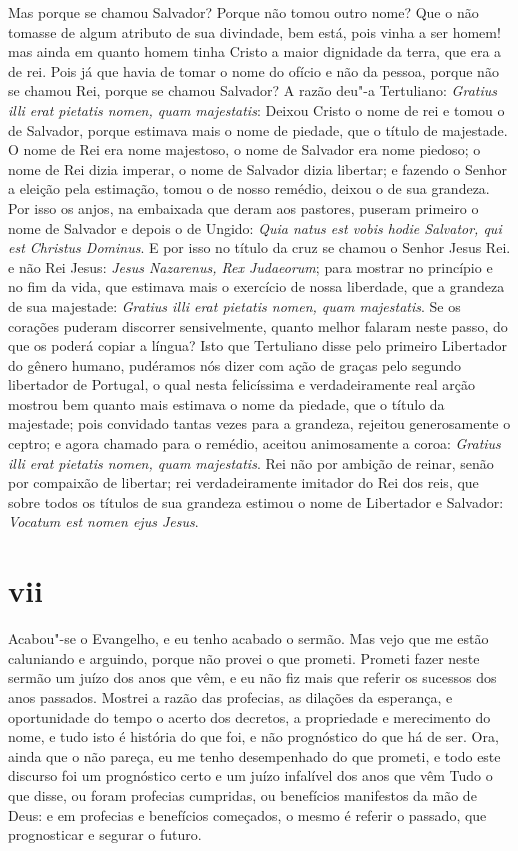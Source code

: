Mas porque se chamou Salvador? Porque não tomou outro nome? Que o não
tomasse de algum atributo de sua divindade, bem está, pois vinha a ser
homem! mas ainda em quanto homem tinha Cristo a maior dignidade da
terra, que era a de rei. Pois já que havia de tomar o nome do ofício e
não da pessoa, porque não se chamou Rei, porque se chamou Salvador? A
razão deu"-a Tertuliano: \emph{Gratius illi erat pietatis nomen, quam
majestatis}: Deixou Cristo o nome de rei e tomou o de Salvador, porque
estimava mais o nome de piedade, que o título de majestade. O nome de
Rei era nome majestoso, o nome de Salvador era nome piedoso; o nome de
Rei dizia imperar, o nome de Salvador dizia libertar; e fazendo o Senhor
a eleição pela estimação, tomou o de nosso remédio, deixou o de sua
grandeza. Por isso os anjos, na embaixada que deram aos pastores,
puseram primeiro o nome de Salvador e depois o de Ungido: \emph{Quia
natus est vobis hodie Salvator, qui est Christus Dominus}. E por isso no
título da cruz se chamou o Senhor Jesus Rei. e não Rei Jesus:
\emph{Jesus Nazarenus, Rex Judaeorum}; para mostrar no princípio e no
fim da vida, que estimava mais o exercício de nossa liberdade, que a
grandeza de sua majestade: \emph{Gratius illi erat pietatis nomen, quam
majestatis}.
Se os corações puderam discorrer sensivelmente, quanto melhor falaram
neste passo, do que os poderá copiar a língua? Isto que Tertuliano disse
pelo primeiro Libertador do gênero humano, pudéramos nós dizer com ação
de graças
pelo segundo libertador de Portugal, o qual nesta felicíssima e
verdadeiramente real arção mostrou bem quanto mais estimava o nome da
piedade, que o título da majestade; pois convidado tantas vezes para a
grandeza, rejeitou generosamente o ceptro; e agora chamado para o
remédio, aceitou animosamente a coroa: \emph{Gratius illi erat pietatis
nomen, quam majestatis}. Rei não por ambição de reinar, senão por
compaixão de libertar; rei verdadeiramente imitador do Rei dos reis, que
sobre todos os títulos de sua grandeza estimou o nome de Libertador e
Salvador: \emph{Vocatum est nomen ejus Jesus}.

\section*{vii}

Acabou"-se o Evangelho, e eu tenho acabado o sermão. Mas vejo que me
estão caluniando e arguindo, porque não provei o que prometi. Prometi
fazer neste sermão um juízo dos anos que vêm, e eu não fiz mais que
referir os sucessos dos anos passados. Mostrei a razão das profecias, as
dilações da esperança, e oportunidade do tempo o acerto dos decretos, a
propriedade e merecimento do nome, e tudo isto é história do que foi, e
não prognóstico do que há de ser. Ora, ainda que o não pareça, eu me
tenho desempenhado do que prometi, e todo este discurso foi um
prognóstico certo e um juízo infalível dos anos que vêm Tudo o que
disse, ou foram profecias cumpridas, ou benefícios manifestos da mão de
Deus: e em profecias e benefícios começados, o mesmo é referir o
passado, que prognosticar e segurar o futuro.

